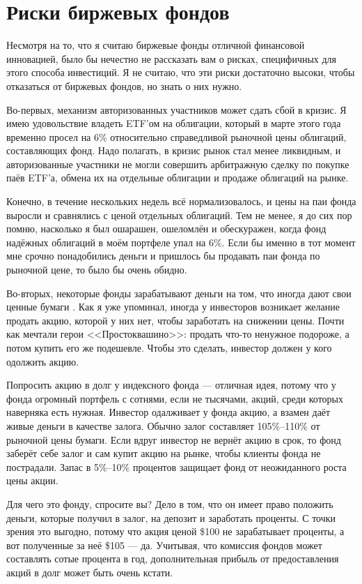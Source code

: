 \section{Риски биржевых фондов}

Несмотря на то, что я считаю биржевые фонды отличной финансовой инновацией, было бы нечестно не рассказать вам о рисках, специфичных для этого способа инвестиций. Я не считаю, что эти риски достаточно высоки, чтобы отказаться от биржевых фондов, но знать о них нужно.

Во-первых, механизм авторизованных участников может сдать сбой в кризис. Я имею удовольствие владеть ETF'ом на облигации, который в марте этого года временно просел на 6\% относительно справедливой рыночной цены облигаций, составляющих фонд. Надо полагать, в кризис рынок стал менее ликвидным, и авторизованные участники не могли совершить арбитражную сделку по покупке паёв ETF'а, обмена их на отдельные облигации и продаже облигаций на рынке.

Конечно, в течение нескольких недель всё нормализовалось, и цены на паи фонда выросли и сравнялись с ценой отдельных облигаций. Тем не менее, я до сих пор помню, насколько я был ошарашен, ошеломлён и обескуражен, когда фонд надёжных облигаций в моём портфеле упал на 6\%. Если бы именно в тот момент мне срочно понадобились деньги и пришлось бы продавать паи фонда по рыночной цене, то было бы очень обидно.

Во-вторых, некоторые фонды зарабатывают деньги на том, что иногда дают свои ценные бумаги . Как я уже упоминал, иногда у инвесторов возникает желание продать акцию, которой у них нет, чтобы заработать на снижении цены. Почти как мечтали герои <<Простоквашино>>: продать что-то ненужное подороже, а потом купить его же подешевле. Чтобы это сделать, инвестор должен у кого одолжить акцию.

Попросить акцию в долг у индексного фонда --- отличная идея, потому что у фонда огромный портфель с сотнями, если не тысячами, акций, среди которых наверняка есть нужная. Инвестор одалживает у фонда акцию, а взамен даёт живые деньги в качестве залога. Обычно залог составляет 105\%--110\% от рыночной цены бумаги. Если вдруг инвестор не вернёт акцию в срок, то фонд заберёт себе залог и сам купит акцию на рынке, чтобы клиенты фонда не пострадали. Запас в 5\%--10\% процентов защищает фонд от неожиданного роста цены акции.

Для чего это фонду, спросите вы? Дело в том, что он имеет право положить деньги, которые получил в залог, на депозит и заработать проценты. С точки зрения это выгодно, потому что акция ценой \$100 не зарабатывает проценты, а вот полученные за неё \$105 --- да. Учитывая, что комиссия фондов может составлять сотые процента в год, дополнительная прибыль от предоставления акций в долг может быть очень кстати.

